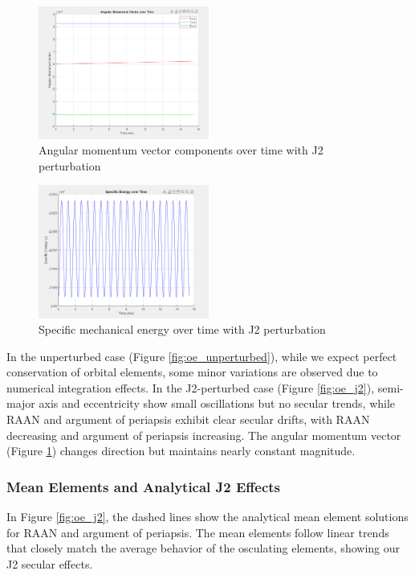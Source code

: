 \begin{figure}[H]
    \centering
    \includegraphics[width=0.5\textwidth]{PS1/Figures/angular_momentum_j2.png}
    \caption{Angular momentum vector components over time with J2 perturbation}
    \label{fig:ang_mom}
\end{figure}

\begin{figure}[H]
    \centering
    \includegraphics[width=0.5\textwidth]{PS1/Figures/specific_energy_j2.png}
    \caption{Specific mechanical energy over time with J2 perturbation}
    \label{fig:energy}
\end{figure}

In the unperturbed case (Figure \ref{fig:oe_unperturbed}), while we expect perfect conservation of orbital elements, some minor variations are observed due to numerical integration effects. In the J2-perturbed case (Figure \ref{fig:oe_j2}), semi-major axis and eccentricity show small oscillations but no secular trends, while RAAN and argument of periapsis exhibit clear secular drifts, with RAAN decreasing and argument of periapsis increasing. The angular momentum vector (Figure \ref{fig:ang_mom}) changes direction but maintains nearly constant magnitude.

\subsubsection{Mean Elements and Analytical J2 Effects}
In Figure \ref{fig:oe_j2}, the dashed lines show the analytical mean element solutions for RAAN and argument of periapsis. The mean elements follow linear trends that closely match the average behavior of the osculating elements, showing our J2 secular effects.

